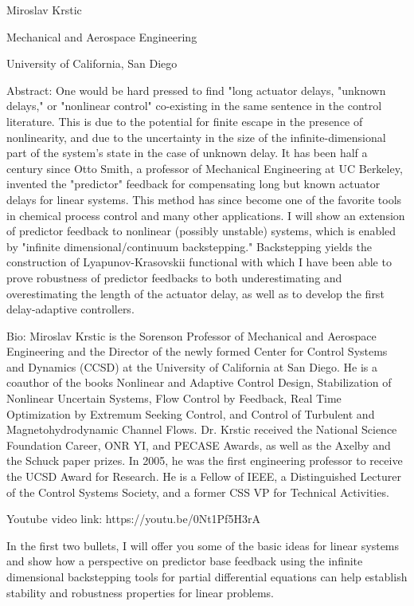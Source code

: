 \documentclass[idxtotoc,hyperref,openany]{labbook} %
\begin{document}
Miroslav Krstic

Mechanical and Aerospace Engineering

University of California, San Diego

Abstract:
One would be hard pressed to find  "long actuator delays, "unknown delays," or "nonlinear control" co-existing in the same sentence in the control literature. This is due to the potential for finite escape in the presence of nonlinearity, and due to the uncertainty in the size of the infinite-dimensional part of the system's state in the case of unknown delay. It has been half a century since Otto Smith, a professor of Mechanical Engineering at UC Berkeley, invented the "predictor" feedback for compensating long but known actuator delays for linear systems. This method has since become one of the favorite tools in chemical process control and many other applications.  I will show an extension of predictor feedback to nonlinear (possibly unstable) systems, which is enabled by "infinite dimensional/continuum backstepping." Backstepping yields the construction of Lyapunov-Krasovskii functional with which I have been able to prove robustness of predictor feedbacks to both underestimating and overestimating the length of the actuator delay, as well as to develop the first delay-adaptive controllers.

Bio:
Miroslav Krstic is the Sorenson Professor of Mechanical and Aerospace Engineering and the Director of the newly formed Center for Control Systems and Dynamics (CCSD) at the University of California at San Diego. He is a coauthor of the books Nonlinear and Adaptive Control Design, Stabilization of Nonlinear Uncertain Systems, Flow Control by Feedback, Real Time Optimization by Extremum Seeking Control, and Control of Turbulent and Magnetohydrodynamic Channel Flows. Dr. Krstic received the National Science Foundation Career, ONR YI, and PECASE Awards, as well as the Axelby and the Schuck paper prizes. In 2005, he was the first engineering professor to receive the UCSD Award for Research. He is a Fellow of IEEE, a Distinguished Lecturer of the Control Systems Society, and a former CSS VP for Technical Activities.

Youtube video link: https://youtu.be/0Nt1Pf5H3rA

In the first two bullets, I will offer you some of the basic ideas for linear systems and show how a perspective on predictor base feedback using the infinite dimensional backstepping tools for partial differential equations can help establish stability and robustness properties for linear problems.
\end{document}
